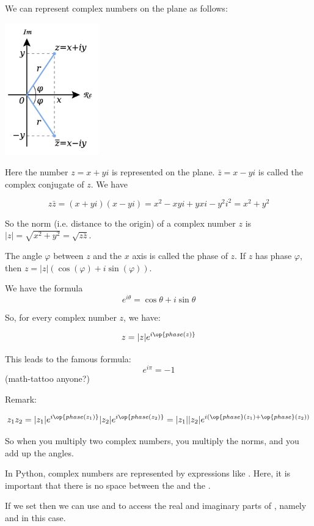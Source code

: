\documentclass[letterpaper,11pt]{amsart}
\theoremstyle{plain}
\theoremstyle{definition}
\begin{document}
We can represent complex numbers on the plane as follows:

\begin{center}
\noindent\includegraphics[width=1.6in]{complex_nums.png}
\end{center}

Here the number $z = x + yi$ is represented on the plane. $\bar{z} = x - yi$ is called the complex conjugate of $z$. We have

$$ z\bar{z} = (x+yi)(x-yi) = x^2 -xyi + yxi -y^2i^2 = x^2 + y^2$$

So the norm (i.e. distance to the origin) of a complex number $z$ is $|z| = \sqrt{x^2+y^2} = \sqrt{z\bar{z}}$. 

The angle $\varphi$ between $z$ and the $x$ axis is called the phase of $z$. If $z$ has phase $\varphi$, then $z = |z|(\cos(\varphi) + i \sin(\varphi))$.

We have the formula
$$e^{i\theta} = \cos{\theta} + i \sin{\theta}$$

So, for every complex number $z$, we have:

$$z = |z|e^{i\op{phase(z)}}$$

This leads to the famous formula:
$$e^{i\pi} = -1$$
(math-tattoo anyone?)

Remark:

$$z_1z_2 = |z_1|e^{i\op{phase(z_1)}}|z_2|e^{i\op{phase(z_2)}} = |z_1||z_2| e^{i(\op{phase}(z_1) + \op{phase}(z_2))}$$

So when you multiply two complex numbers, you multiply the norms, and you add up the angles. 

In Python, complex numbers are represented by expressions like . Here, it is important that there is no space between the  and the . 

If we set  then we can use  and  to access the real and imaginary parts of , namely  and  in this case. 
\end{document}
